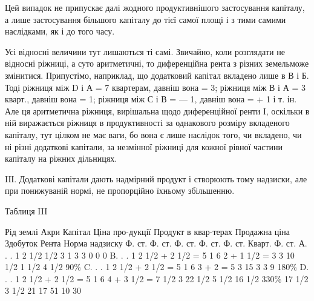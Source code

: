 Цей випадок не припускає далі жодного продуктивнішого застосування
капіталу, а лише застосування більшого капіталу до тієї самої площі і з тими
самими наслідками, як і до того часу.

Усі відносні величини тут лишаються ті самі. Звичайно, коли розглядати
не відносні ріжниці, а суто аритметичні, то диференційна рента з різних земельможе
змінитися. Припустімо, наприклад, що додатковий капітал вкладено лише
в В і Б. Тоді ріжниця між D і А = 7 квартерам, давніш вона = 3; ріжниця
між В і А = 3 кварт., давніш вона = 1; ріжниця між С і В = — 1, давніш
вона = + 1 і т. ін. Але ця аритметична ріжниця, вирішальна щодо диференційної
ренти І, оскільки в ній виражається ріжниця в продуктивності за однакового
розміру вкладеного капіталу, тут цілком не має ваги, бо вона є лише
наслідок того, чи вкладено, чи ні різні додаткові капітали, за незмінної ріжниці
для кожної рівної частини капіталу на ріжних дільницях.

IIІ. Додаткові капітали дають надмірний продукт і створюють тому надзиски,
але при понижуваній нормі, не пропорційно їхньому збільшенню.

Таблиця III

Рід  землі    Акри    Капітал    Ціна про-дукції     Продукт в квар-терах    Продажна  ціна
Здобуток    Рента        Норма надзиску
        Ф. ст. Ф. ст. Ф. ст. Ф. ст. Ф. ст. Кварт. Ф. ст.
А. . .    1                        2 1/2    1/2  3                            1    3             3  
  0          0              0
B. . .    1    2 1/2 + 2 1/2 = 5    1     6    2 + 1 1/2 = 3          3      10 1/2     1 1/2    4
1/2    90\%
C. . .    1    2 1/2 + 2 1/2 = 5    1     6    3 + 2 = 5                    3    15    3    3       
   9          180\%
D. . .    1    2 1/2 + 2 1/2 = 5    1     6    4 + 3 1/2 = 7 1/2    3    22 1/2    5 1/2    16 1/2 
330\%
                                 17 1/2  3 1/2  21                         17                    51 
       10           30

